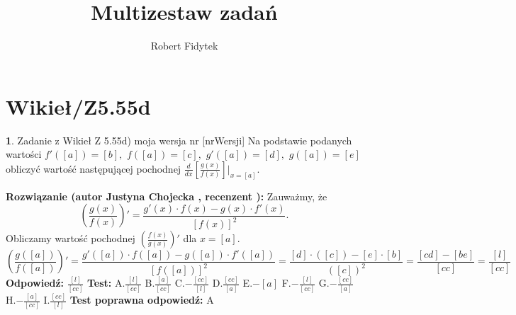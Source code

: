 \documentclass[12pt, a4paper]{article}
\title{Multizestaw zadań}
\author{Robert Fidytek}
\date{}
\theoremstyle{definition} %
\newtheorem{zad}{}
\newcommand{\kategoria}[1]{\section{#1}} %
\newcommand{\zadStart}[1]{\begin{zad}#1\newline} %
\newcommand{\zadStop}{\end{zad}}   %
\newcommand{\rozwStart}[2]{\noindent \textbf{Rozwiązanie (autor #1 , recenzent #2): }\newline} %
\newcommand{\rozwStop}{\newline}                                            %
\newcommand{\odpStart}{\noindent \textbf{Odpowiedź:}\newline}    %
\newcommand{\odpStop}{\newline}                                             %
\newcommand{\testStart}{\noindent \textbf{Test:}\newline} %
\newcommand{\testStop}{\newline} %
\newcommand{\kluczStart}{\noindent \textbf{Test poprawna odpowiedź:}\newline} %
\newcommand{\kluczStop}{\newline} %
\begin{document}
\maketitle


\kategoria{Wikieł/Z5.55d}
\zadStart{Zadanie z Wikieł Z 5.55d) moja wersja nr [nrWersji]}
Na podstawie podanych wartości $f'([a])=[b],$ $f([a])=[c],$ $g'([a])=[d],$ $g([a])=[e]$ obliczyć wartość następującej pochodnej $\frac{d}{dx}\left[\frac{g(x)}{f(x)}\right]\big|_{x=[a]}$.
\zadStop
\rozwStart{Justyna Chojecka}{}
Zauważmy, że 
$$\left(\frac{g(x)}{f(x)}\right)'=\frac{g'(x)\cdot f(x)-g(x)\cdot f'(x)}{\left[f(x)\right]^{2}}.$$
Obliczamy wartość pochodnej $\left(\frac{f(x)}{g(x)}\right)'$ dla $x=[a]$.
$$\left(\frac{g([a])}{f([a])}\right)'=\frac{g'([a])\cdot f([a])-g([a])\cdot f'([a])}{\left[f([a])\right]^{2}}=\frac{[d]\cdot ([c]) - [e]\cdot [b]}{([c])^{2}}=\frac{[cd]-[be]}{[cc]}=\frac{[l]}{[cc]}$$
\rozwStop
\odpStart
$\frac{[l]}{[cc]}$
\odpStop
\testStart
A.$\frac{[l]}{[cc]}$
B.$\frac{[a]}{[cc]}$
C.$-\frac{[cc]}{[l]}$
D.$\frac{[cc]}{[a]}$
E.$-[a]$
F.$-\frac{[l]}{[cc]}$
G.$-\frac{[cc]}{[a]}$
H.$-\frac{[a]}{[cc]}$
I.$\frac{[cc]}{[l]}$
\testStop
\kluczStart
A
\kluczStop
\end{document}
